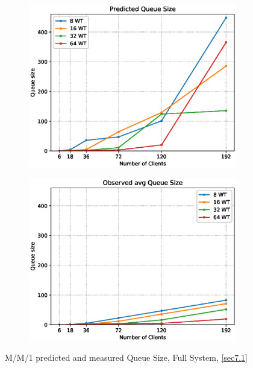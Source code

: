 \documentclass[11pt,a4paper]{article}
\begin{document}
\begin{figure}
    \begin{subfigure}{.5\textwidth}
        \includegraphics[width=1\linewidth]{plots/7_MM1_QueueSizePred.eps}
    \end{subfigure}
    \begin{subfigure}{.5\textwidth}
        \includegraphics[width=1\linewidth]{plots/7_MM1_QueueSizeObserved.eps}
    \end{subfigure}
    \caption{M/M/1 predicted and measured Queue Size, Full System, \autoref{sec7.1}}
    \label{fig:mm1-queueLen}
\end{figure}
\end{document}

